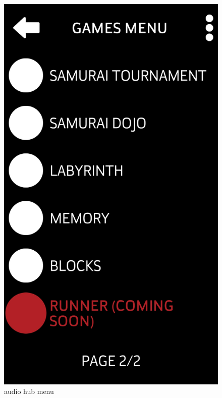 \documentclass[a4paper,twoside,12pt]{book}
\begin{document}
\begin{figure}[H]
\centering
\begin{minipage}{.5\textwidth}
  \centering
  \includegraphics[width=.8\linewidth]{audio hub menu.jpg}
  \caption{audio hub menu}
  \label{fig:audio hub menu}
\end{minipage}%
\begin{minipage}{.5\textwidth}
  \centering

\end{minipage}
\end{figure}
\end{document}
